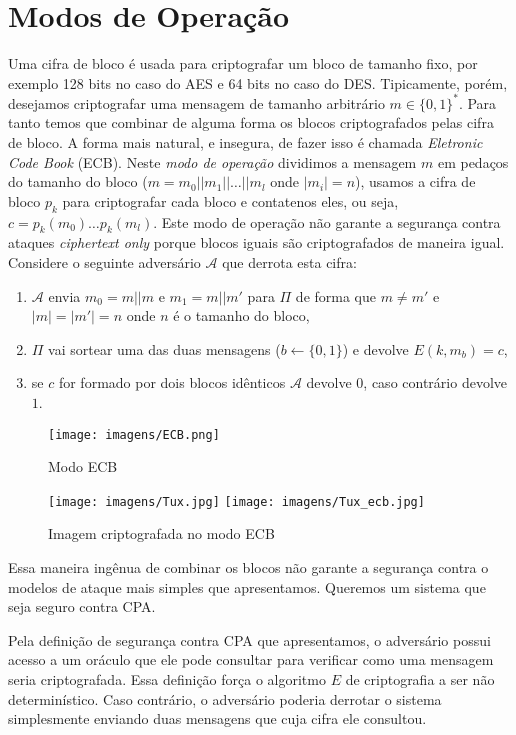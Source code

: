 \section{Modos de Operação}
\label{sec:modos-de-operacao-bloco}

Uma cifra de bloco é usada para criptografar um bloco de tamanho fixo, por exemplo 128 bits no caso do AES e 64 bits no caso do DES.
Tipicamente, porém, desejamos criptografar uma mensagem de tamanho arbitrário $m \in \{0,1\}^*$.
Para tanto temos que combinar de alguma forma os blocos criptografados pelas cifra de bloco.
A forma mais natural, e insegura, de fazer isso é chamada {\em Eletronic Code Book} (ECB).
Neste {\em modo de operação} dividimos a mensagem $m$ em pedaços do tamanho do bloco ($m = m_0 || m_1 || \dots || m_l$ onde $|m_i| = n$), usamos a cifra de bloco $p_k$ para criptografar cada bloco e contatenos eles, ou seja, $c = p_k(m_0) \dots p_k(m_l)$.
Este modo de operação não garante a segurança contra ataques {\em ciphertext only} porque blocos iguais são criptografados de maneira igual.
Considere o seguinte adversário $\mathcal{A}$ que derrota esta cifra:
\begin{enumerate}
\item $\mathcal{A}$ envia $m_0 = m||m$ e $m_1=m||m'$ para $\Pi$ de forma que $m \neq m'$ e $|m| = |m'| = n$ onde $n$ é o tamanho do bloco,
\item $\Pi$ vai sortear uma das duas mensagens ($b \leftarrow \{0,1\}$) e devolve $E(k, m_b) =c$,
\item se $c$ for formado por dois blocos idênticos $\mathcal{A}$ devolve $0$, caso contrário devolve $1$.
\end{enumerate}

\begin{figure}[!htp]
  \centering
  \texttt{[image: imagens/ECB.png]}
  \caption{Modo ECB}
\end{figure}

\begin{figure}[!htp]
  \centering
  \texttt{[image: imagens/Tux.jpg]}
  \texttt{[image: imagens/Tux\_ecb.jpg]}
  \caption{Imagem criptografada no modo ECB}
\end{figure}

Essa maneira ingênua de combinar os blocos não garante a segurança contra o modelos de ataque mais simples que apresentamos.
Queremos um sistema que seja seguro contra CPA.

Pela definição de segurança contra CPA que apresentamos, o adversário possui acesso a um oráculo que ele pode consultar para verificar como uma mensagem seria criptografada.
Essa definição força o algoritmo $E$ de criptografia a ser não determinístico.
Caso contrário, o adversário poderia derrotar o sistema simplesmente enviando duas mensagens que cuja cifra ele consultou.

